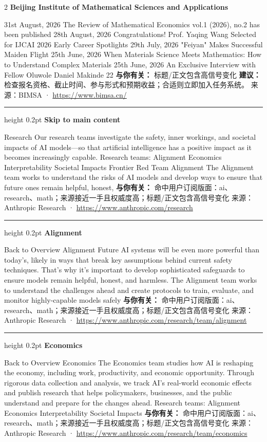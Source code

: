 \documentclass[10.5pt]{ctexart}
\begin{document}
\begin{multicols}{2}
{\large\bfseries Beijing Institute of Mathematical Sciences and Applications}\par
31st August, 2026 The Review of Mathematical Economics vol.1 (2026), no.2 has been published 28th August, 2026 Congratulations! Prof. Yaqing Wang Selected for IJCAI 2026 Early Career Spotlights 29th July, 2026 "Feiyan" Makes Successful Maiden Flight 25th June, 2026 When Materials Science Meets Mathematics: How to Understand Complex Materials 25th June, 2026 An Exclusive Interview with Fellow Oluwole Daniel Makinde 22
\textbf{与你有关：} 标题/正文包含高信号变化
\textbf{建议：} 检查报名资格、截止时间、参与形式和预期收益；合适则立即加入任务系统。
{\footnotesize\color{ormuted} 来源：BIMSA · \url{https://www.bimsa.cn/}}
\vspace{2mm}
\hrule height 0.2pt
\vspace{2mm}
{\large\bfseries Skip to main content}\par
Research Our research teams investigate the safety, inner workings, and societal impacts of AI models—so that artificial intelligence has a positive impact as it becomes increasingly capable. Research teams: Alignment Economics Interpretability Societal Impacts Frontier Red Team Alignment The Alignment team works to understand the risks of AI models and develop ways to ensure that future ones remain helpful, honest, 
\textbf{与你有关：} 命中用户订阅版面：ai、research、math；来源接近一手且权威度高；标题/正文包含高信号变化
{\footnotesize\color{ormuted} 来源：Anthropic Research · \url{https://www.anthropic.com/research}}
\vspace{2mm}
\hrule height 0.2pt
\vspace{2mm}
{\large\bfseries Alignment}\par
Back to Overview Alignment Future AI systems will be even more powerful than today’s, likely in ways that break key assumptions behind current safety techniques. That’s why it’s important to develop sophisticated safeguards to ensure models remain helpful, honest, and harmless. The Alignment team works to understand the challenges ahead and create protocols to train, evaluate, and monitor highly-capable models safely
\textbf{与你有关：} 命中用户订阅版面：ai、research、math；来源接近一手且权威度高；标题/正文包含高信号变化
{\footnotesize\color{ormuted} 来源：Anthropic Research · \url{https://www.anthropic.com/research/team/alignment}}
\vspace{2mm}
\hrule height 0.2pt
\vspace{2mm}
{\large\bfseries Economics}\par
Back to Overview Economics The Economics team studies how AI is reshaping the economy, including work, productivity, and economic opportunity. Through rigorous data collection and analysis, we track AI's real-world economic effects and publish research that helps policymakers, businesses, and the public understand and prepare for the changes ahead. Research teams: Alignment Economics Interpretability Societal Impacts
\textbf{与你有关：} 命中用户订阅版面：ai、research、math；来源接近一手且权威度高；标题/正文包含高信号变化
{\footnotesize\color{ormuted} 来源：Anthropic Research · \url{https://www.anthropic.com/research/team/economics}}
\end{multicols}
\end{document}
